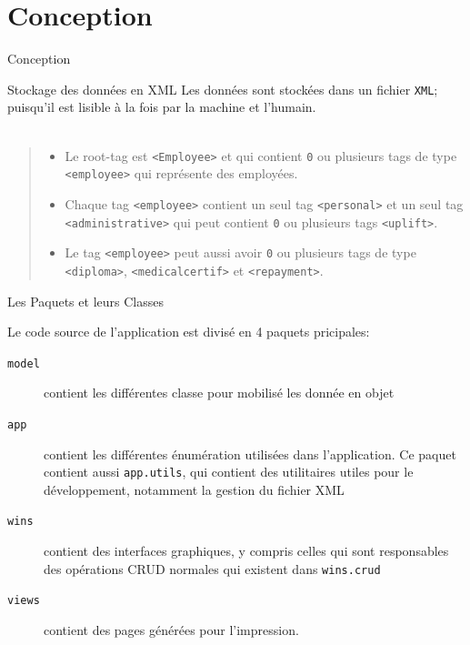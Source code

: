 \documentclass[captions=tableheading]{beamer}
\begin{document}
\section{Conception}
\label{sec:orgab0bc2d}
\begin{frame}[fragile,label={sec:org3a43591}]{Conception}
 \begin{block}{Stockage des données en XML}
\pause
Les données sont stockées dans un fichier \texttt{XML}; \pause \alert{puisqu'il est lisible à la fois par la machine et l'humain}.\\

\pause\\

\begin{quote}
\begin{itemize}
\item Le root-tag est \texttt{<Employee>} et qui contient \alert{\texttt{0} ou plusieurs} tags de type \texttt{<employee>} qui représente des employées. \\
\end{itemize}
\pause
\begin{itemize}
\item Chaque tag \texttt{<employee>} contient \alert{un seul} tag \texttt{<personal>} et \alert{un seul} tag \texttt{<administrative>} qui peut contient \alert{\texttt{0} ou plusieurs} tags \texttt{<uplift>}. \\
\end{itemize}
\pause
\begin{itemize}
\item Le tag \texttt{<employee>} peut aussi avoir \alert{\texttt{0} ou plusieurs} tags de type \texttt{<diploma>}, \texttt{<medicalcertif>} et \texttt{<repayment>}.\\
\end{itemize}
\end{quote}
\end{block}
\end{frame}

\begin{frame}[fragile,label={sec:org40a3538}]{Les Paquets et leurs Classes}
 \clearpage

Le code source de l'application est divisé en 4 paquets pricipales: \pause

\begin{description}
\item[{\texttt{model}}] contient les différentes classe pour mobilisé les donnée en objet \pause
\item[{\texttt{app}}] contient les différentes énumération utilisées dans l'application. \pause Ce paquet contient aussi  \texttt{app.utils}, qui contient des utilitaires utiles pour le développement, notamment la gestion du \alert{fichier XML} \pause
\item[{\texttt{wins}}] contient des interfaces graphiques, y compris celles qui sont responsables des opérations CRUD normales qui existent dans \texttt{wins.crud} \pause
\item[{\texttt{views}}] contient des pages générées pour l'impression.
\end{description}
\end{frame}
\end{document}
